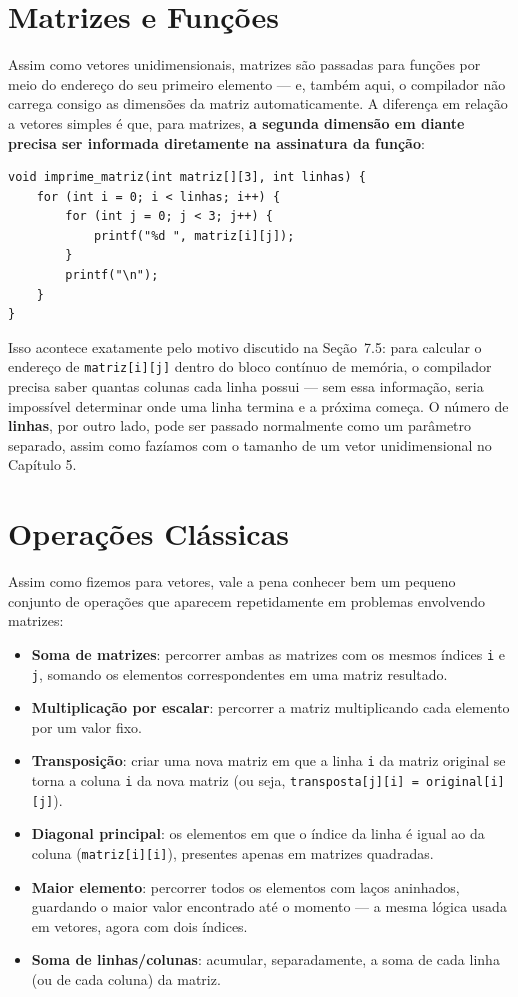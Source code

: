 \documentclass[12pt,a4paper,oneside]{extreport}
\begin{document}
\section{Matrizes e Funções}

Assim como vetores unidimensionais, matrizes são passadas para funções por meio do endereço do seu primeiro elemento — e, também aqui, o compilador não carrega consigo as dimensões da matriz automaticamente. A diferença em relação a vetores simples é que, para matrizes, \textbf{a segunda dimensão em diante precisa ser informada diretamente na assinatura da função}:

\begin{lstlisting}
void imprime_matriz(int matriz[][3], int linhas) {
    for (int i = 0; i < linhas; i++) {
        for (int j = 0; j < 3; j++) {
            printf("%d ", matriz[i][j]);
        }
        printf("\n");
    }
}
\end{lstlisting}

Isso acontece exatamente pelo motivo discutido na Seção~7.5: para calcular o endereço de \texttt{matriz[i][j]} dentro do bloco contínuo de memória, o compilador precisa saber quantas colunas cada linha possui — sem essa informação, seria impossível determinar onde uma linha termina e a próxima começa. O número de \textbf{linhas}, por outro lado, pode ser passado normalmente como um parâmetro separado, assim como fazíamos com o tamanho de um vetor unidimensional no Capítulo 5.

\section{Operações Clássicas}

Assim como fizemos para vetores, vale a pena conhecer bem um pequeno conjunto de operações que aparecem repetidamente em problemas envolvendo matrizes:

\begin{itemize}
    \item \textbf{Soma de matrizes}: percorrer ambas as matrizes com os mesmos índices \texttt{i} e \texttt{j}, somando os elementos correspondentes em uma matriz resultado.
    \item \textbf{Multiplicação por escalar}: percorrer a matriz multiplicando cada elemento por um valor fixo.
    \item \textbf{Transposição}: criar uma nova matriz em que a linha \texttt{i} da matriz original se torna a coluna \texttt{i} da nova matriz (ou seja, \texttt{transposta[j][i] = original[i][j]}).
    \item \textbf{Diagonal principal}: os elementos em que o índice da linha é igual ao da coluna (\texttt{matriz[i][i]}), presentes apenas em matrizes quadradas.
    \item \textbf{Maior elemento}: percorrer todos os elementos com laços aninhados, guardando o maior valor encontrado até o momento — a mesma lógica usada em vetores, agora com dois índices.
    \item \textbf{Soma de linhas/colunas}: acumular, separadamente, a soma de cada linha (ou de cada coluna) da matriz.
\end{itemize}
\end{document}
